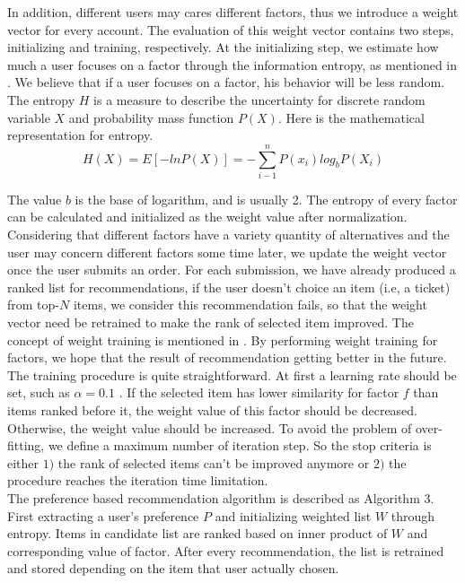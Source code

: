 \documentclass{sig-alternate-05-2015}
\begin{document}
In addition, different users may cares different factors, thus we introduce a weight vector for every account. The evaluation of this weight vector contains two steps, initializing and training, respectively. At the initializing step, we estimate how much a user focuses on a factor through the information entropy, as mentioned in \cite{yang:pers}. We believe that if a user focuses on a factor, his behavior will be less random. The entropy $H$ is a measure to describe the uncertainty for discrete random variable $X$ and probability mass function $P(X)$. Here is the mathematical representation for entropy.\\
\begin{equation}
H(X)=E[-lnP(X)]= - \sum_{i-1}^n P(x_i)log_bP(X_i)
\end{equation}\par
The value $b$ is the base of logarithm, and is usually 2. The entropy of every factor can be calculated and initialized as the weight value after normalization. Considering that different factors have a variety quantity of alternatives and the user may concern different factors some time later, we update the weight vector once the user submits an order. For each submission, we have already produced a ranked list for recommendations, if the user doesn't choice an item (i.e, a ticket) from top-$N$ items, we consider this recommendation fails, so that the weight vector need be retrained to make the rank of selected item improved. The concept of weight training is mentioned in \cite{lor:flight}. By performing weight training for factors, we hope that the result of recommendation getting better in the future. The training procedure is quite straightforward. At first a learning rate should be set, such as $\alpha = 0.1$ . If the selected item has lower similarity for factor $f$ than items ranked before it, the weight value of this factor should be decreased. Otherwise, the weight value should be increased. To avoid the problem of over-fitting, we define a maximum number of iteration step. So the stop criteria is either $1)$ the rank of selected items can't be improved anymore or $2)$ the procedure reaches the iteration time limitation.\\
The preference based recommendation algorithm is described as Algorithm 3. First extracting a user's preference  $P$ and initializing weighted list $W$ through entropy. Items in candidate list are ranked based on inner product of $W$ and corresponding value of factor. After every recommendation, the list is retrained and stored depending on the item that user actually chosen.
\end{document}
